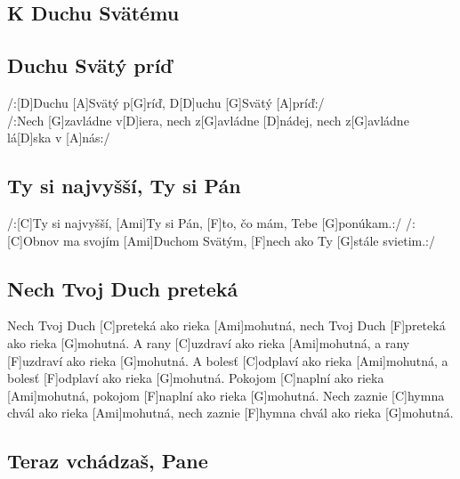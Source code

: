 \documentclass[10pt]{article}
\begin{document}
\begin{Large}
\newpage
\section{K Duchu Svätému}

\begin{multicols}{2}
\begin{minipage}{\textwidth}
\subsection{Duchu Svätý príď}
\begin{guitar}
	/:[D]Duchu [A]Svätý p[G]ríď,
	D[D]uchu [G]Svätý [A]príď:/
	\\
	/:Nech [G]zavládne v[D]iera,
	nech z[G]avládne [D]nádej,
	nech z[G]avládne lá[D]ska v [A]nás:/
\end{guitar}
\end{minipage}

\begin{minipage}{\textwidth}
\subsection{Ty si najvyšší, Ty si Pán}
\begin{guitar}
	/:[C]Ty si najvyšší, [Ami]Ty si Pán,
	[F]to, čo mám, Tebe [G]ponúkam.:/
	/:[C]Obnov ma svojím [Ami]Duchom Svätým,
	[F]nech ako Ty [G]stále svietim.:/
\end{guitar}
\end{minipage}
\end{multicols}


\begin{minipage}{\textwidth}
\begin{multicols*}{2}
\subsection{Nech Tvoj Duch preteká}
\begin{guitar}
	Nech Tvoj Duch [C]preteká ako rieka [Ami]mohutná,
	nech Tvoj Duch [F]preteká ako rieka [G]mohutná.
	A rany [C]uzdraví ako rieka [Ami]mohutná,
	a rany [F]uzdraví ako rieka [G]mohutná.
	A bolesť [C]odplaví ako rieka [Ami]mohutná,
	a bolesť [F]odplaví ako rieka [G]mohutná.
	Pokojom [C]naplní ako rieka [Ami]mohutná,
	pokojom [F]naplní ako rieka [G]mohutná.
	Nech zaznie [C]hymna chvál ako rieka 
	[Ami]mohutná,
	nech zaznie [F]hymna chvál ako rieka 
	[G]mohutná.
\end{guitar}
\columnbreak
\subsection{Teraz vchádzaš, Pane}
\end{multicols*}
\end{minipage}


\end{Large}
\end{document}
